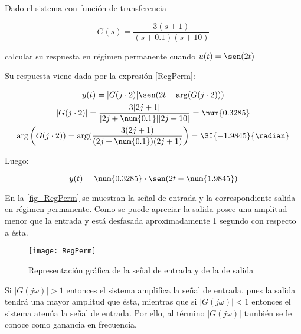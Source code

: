 \begin{ejemplo}

Dado el sistema con función de transferencia

\begin{equation*}
	G(s)=\dfrac{3(s+1)}{(s+\num{0.1})(s+10)}
\end{equation*}

calcular su respuesta en régimen permanente cuando $u(t)=\sen(2t)$

Su respuesta viene dada por la expresión \eqref{RegPerm}:

\begin{gather*}
	y(t)= |G(j\cdot 2)| \sen(2t +\arg(G(j\cdot 2))) \\ 
	|G(j\cdot 2)|=\dfrac{3|2j+1|}{|2j+\num{0.1}||2j+10|} = \num{0.3285} \\ 
	\arg\left(G(j\cdot 2))= \arg (\dfrac{3(2j+1)}{(2j+\num{0.1})(2j+1)}\right)=\SI{-1.9845}{\radian}
\end{gather*}
	
Luego:

\begin{equation*}
	y(t)=\num{0.3285} \cdot \sen (2t-\num{1.9845})
\end{equation*}

En la \autoref{fig_RegPerm} se muestran la señal de entrada y la correspondiente salida en
régimen permanente. Como se puede apreciar la salida posee una amplitud menor que la entrada y
está desfasada aproximadamente 1 segundo con respecto a ésta.

\end{ejemplo}


\begin{figure}[h!]\centering
	\texttt{[image: RegPerm]}
	\caption{Representación gráfica de la señal de entrada y de la de salida}\label{fig_RegPerm}
	\bigskip
\end{figure}

Si $|G(j\omega)|>1$ entonces el sistema amplifica la señal de entrada, pues la salida tendrá
una mayor amplitud que ésta, mientras que si $|G(j\omega)|<1$ entonces el sistema atenúa la
señal de entrada. Por ello, al término $|G(j\omega)|$ también se le conoce como ganancia en
frecuencia.
